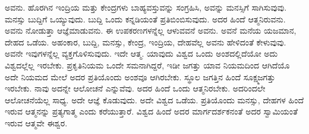 ಅವನು. ಹೊರಗಿನ ಇಂದ್ರಿಯ ಮತ್ತು ಕೇಂದ್ರಗಳು ಬಾಹ್ಯವಸ್ತುವನ್ನು ಸಂಗ್ರಹಿಸಿ, ಅವನ್ನು ಮನಸ್ಸಿಗೆ ಸಾಗಿಸುವುವು. ಮನಸ್ಸು ಬುದ್ದಿಗೆ ಒಯ್ಯುವುದು. ಬುದ್ದಿ ಒಂದು ಕನ್ನಡಿಯಂತೆ ಪ್ರತಿಬಿಂಬಿಸುವುದು. ಅದರ ಹಿಂದೆ ಆತ್ಮನಿರುವನು. ಅವನು ನೋಡುತ್ತಾ ಆಜ್ಞೆಮಾಡುವನು. ಈ ಉಪಕರಣಗಳನ್ನೆಲ್ಲ ಆಳುವವನೆ ಅವನು. ಅವನೆ ಮನೆಯ ಯಜಮಾನ, ದೇಹದ ಒಡೆಯ. ಅಹಂಕಾರ, ಬುದ್ದಿ, ಮನಸ್ಸು, ಕೇಂದ್ರ, ಇಂದ್ರಿಯ, ದೇಹವೆಲ್ಲ ಅವನು ಹೇಳಿದಂತೆ ಕೇಳುವುವು. ಅವನೇ ಇವುಗಳನ್ನೆಲ್ಲ ವ್ಯಕ್ತಗೊಳಿಸುವುದು. ಇದೇ ಆತ್ಮ. ಯಾವುದು ವಿಶ್ವದ ಒಂದು ಅಂಶದಲ್ಲಿದೆಯೋ ಅದು ವಿಶ್ವದಲ್ಲೆಲ್ಲ ಇರಬೇಕು. ಪ್ರಕೃತಿನಿಯಮ ಒಂದೇ ಸಮನಾಗಿದ್ದರೆ, ಇಡೀ ಜಗತ್ತು ಯಾವ ನಿಯಮದಿಂದ ಆಗಿದೆಯೊ ಅದೇ ನಿಯಮದ ಮೇಲೆ ಅದರ ಪ್ರತಿಯೊಂದು ಅಂಶವೂ ಆಗಿರಬೇಕು. ಸ್ಥೂಲ ಜಗತ್ತಿನ ಹಿಂದೆ ಸೂಕ್ಷ್ಮಜಗತ್ತು ಇರಬೇಕು. ನಾವು ಅದನ್ನೇ ಆಲೋಚನೆ ಎನ್ನುವೆವು. ಅದರ ಹಿಂದೆ ಒಂದು ಆತ್ಮನಿರಬೇಕು. ಅದರಿಂದಲೇ ಆಲೋಚನೆಯೆಲ್ಲ ಸಾಧ್ಯ. ಅದೇ ಆಜ್ಞೆ ಕೊಡುವುದು. ಅದೇ ವಿಶ್ವದ ಒಡೆಯ. ಪ್ರತಿಯೊಂದು ಮನಸ್ಸು, ದೇಹಗಳ ಹಿಂದೆ ಇರುವ ಆತ್ಮನನ್ನು ಪ್ರತ್ಯಗಾತ್ಮ ಎಂದು ಕರೆಯುತ್ತಾರೆ. ವಿಶ್ವದ ಹಿಂದೆ ಅದರ ಮಾರ್ಗದರ್ಶಕನಂತೆ ಅದರ ಸ್ವಾಮಿಯಂತೆ ಇರುವ ಆತ್ಮವೇ ಈಶ್ವರ.

\newpage

